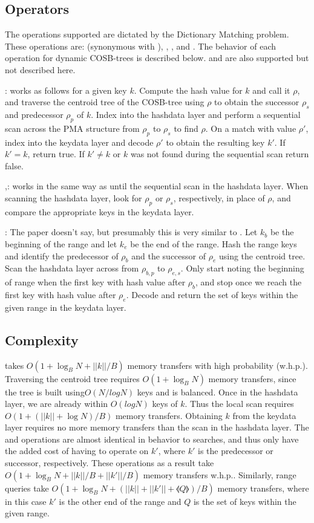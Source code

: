 \documentclass{style}
\begin{document}
\subsection{Operators}
The operations supported are dictated by the Dictionary Matching problem. These operations are: \Search{} (synonymous with \Member{}), \Pred{}, \Succ{}, and \Range{}. The behavior of each operation for dynamic COSB-trees is described below. \Insertkonly{} and \Delete{} are also supported but not described here.

\Search{}: works as follows for a given key $k$. Compute the hash value for $k$ and call it $\rho$, and traverse the centroid tree of the COSB-tree using $\rho$ to obtain the successor $\rho_{s}$ and predecessor $\rho_{p}$ of $k$. Index into the hashdata layer and perform a sequential scan across the PMA structure from $\rho_{p}$  to $\rho_{s}$ to find $\rho$. On a match with value $\rho'$, index into the keydata layer and decode $\rho'$ to obtain the resulting key $k'$. If $k' = k$, return true. If $k' \ne k$ or $k$ was not found during the sequential scan return false.

\Pred{},\Succ{}: works in the same way as \Search{} until the sequential scan in the hashdata layer. When scanning the hashdata layer, look for $\rho_{p}$ or $\rho_{s}$, respectively, in place of $\rho$, and compare the appropriate keys in the keydata layer. 

\Range{}: The paper doesn't say, but presumably this is very similar to \Search{}. Let $k_{b}$ be the beginning of the range and let $k_{e}$ be the end of the range. Hash the range keys and identify the predecessor of $\rho_{b}$ and the successor of $\rho_{e}$ using the centroid tree. Scan the hashdata layer across from  $\rho_{b,p}$ to  $\rho_{e,s}$. Only start noting the beginning of range when the first key with hash value after $\rho_{b}$, and stop once we reach the first key with hash value after $\rho_{e}$. Decode and return the set of keys within the given range in the keydata layer.

\subsection{Complexity}
\Search{} takes $O(1+\log_{B}N+||k||/B)$ memory transfers with high probability (w.h.p.). Traversing the centroid tree requires  $O(1+\log_{B}N)$ memory transfers, since the tree is built using$O(N/logN)$ keys and is balanced. Once in the hashdata layer, we are already within $O(logN)$ keys of $k$. Thus the local scan requires $O(1+(||k||+\log{}N)/B)$ memory transfers. Obtaining $k$ from the keydata layer requires no more memory transfers than the scan in the hashdata layer. The \Pred{} and \Succ{} operations are almost identical in behavior to searches, and thus only have the added cost of having to operate on $k'$, where $k'$ is the predecessor or successor, respectively. These operations as a result take $O(1+\log_{B}N+||k||/B+||k'||/B)$ memory transfers w.h.p.. Similarly, range queries take $O(1+\log_{B}N+(||k||+||k'||+\llangle{}Q\rrangle{})/B)$ memory transfers, where in this case $k'$ is the other end of the range and $Q$ is the set of keys within the given range.
\end{document}
